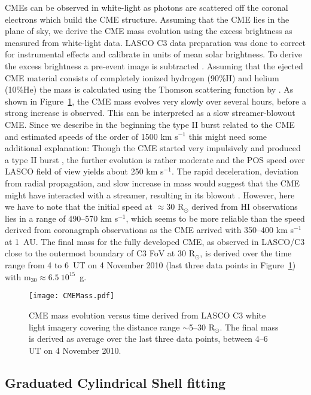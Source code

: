 \documentclass[draft]{agujournal}
\begin{document}
CMEs can be observed in white-light as photons are scattered off the coronal electrons which build the CME structure. Assuming that the CME lies in the plane of sky, we derive the CME mass evolution using the excess brightness as measured from white-light data. LASCO C3 data preparation was done to correct for instrumental effects and calibrate in units of mean solar brightness. To derive the excess brightness a pre-event image is subtracted \citep[see e.g.][]{vou00}. Assuming that the ejected CME material consists of completely ionized hydrogen (90\%H) and helium (10\%He) the mass is calculated using the Thomson scattering function by \citet{bil66}. As shown in Figure~\ref{fig:mass}, the CME mass evolves very slowly over several hours, before a strong increase is observed. This can be interpreted as a slow streamer-blowout CME. Since we describe in the beginning the type II burst related to the CME and estimated speeds of the order of 1500 km s$^{-1}$ this might need some additional explanation:
Though the CME started very impulsively and produced a type II burst \citep[e.g.][]{bai12}, the further evolution is rather moderate and the POS speed over LASCO field of view yields about 250 km s$^{-1}$. The rapid deceleration, deviation from radial propagation, and slow increase in mass would suggest that the CME might have interacted with a streamer, resulting in its blowout \citep[e.g.][]{ese15}. However, here we have to note that the initial speed at $\approx 30$ R$_\odot$ derived from HI observations lies in a range of 490--570 km s$^{-1}$, which seems to be more reliable than the speed derived from coronagraph observations as the CME arrived with 350--400 km s$^{-1}$ at 1~AU.
The final mass for the fully developed CME, as observed in LASCO/C3 close to the outermost boundary of C3 FoV at 30 R$_\odot$, is derived over the time range from 4 to 6~UT on 4 November 2010 (last three data points in Figure~\ref{fig:mass}) with m$_{30}\approx 6.5~10^{15}$~g.


\begin{figure}[h]
\centering
\texttt{[image: CMEMass.pdf]}
\caption{CME mass evolution versus time derived from LASCO C3 white light imagery covering the distance range $\sim$5--30 R$_\odot$. The final mass is derived as average over the last three data points, between 4--6 UT on 4 November 2010.}
\label{fig:mass}
\end{figure}

\subsection{Graduated Cylindrical Shell fitting}
\end{document}
